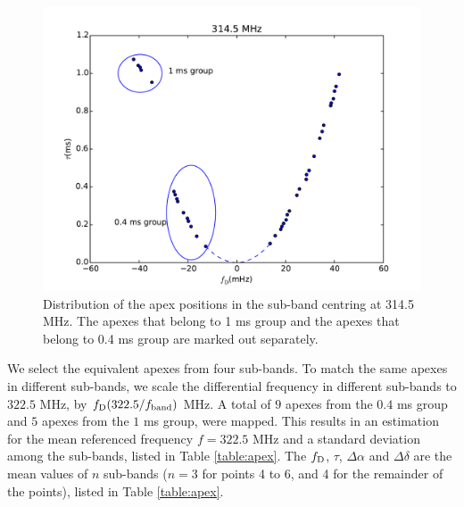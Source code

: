 \documentclass[useAMS,usenatbib]{mn2e}
\begin{document}
\begin{figure}
\centering
\includegraphics[width=\linewidth]{apex_pos.pdf}
\caption{Distribution of the apex positions in the sub-band centring at 314.5 MHz. The apexes that belong to 1 ms group and the apexes that belong to 0.4 ms group are marked out separately.}
\label{fig:apex_pos}
\end{figure}

We select the equivalent apexes from four sub-bands. To match the same apexes in different sub-bands, we scale the differential frequency in different sub-bands to $322.5$ MHz, by $f_{\rm D} (322.5/f_{\rm band})$ MHz. A total of $9$ apexes from the $0.4$ ms group and $5$ apexes from the $1$ ms
group, were mapped. This results in an estimation
for the mean referenced frequency $f=322.5$ MHz and a standard
deviation among the sub-bands, listed in Table
\ref{table:apex}. The $f_{\rm D}$, $\tau$, $\Delta\alpha$ and $\Delta\delta$
are the mean values of $n$ sub-bands
($n=3$ for points 4 to 6, and 4 for the remainder of the points), listed
in Table \ref{table:apex}. 
\end{document}
